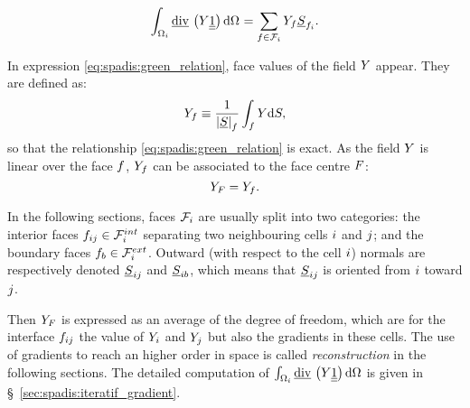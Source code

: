 \begin{equation}\label{eq:spadis:green_relation}
\int_{\Omega_{i}} \underline{\text{div}}\, \left( Y \underline{\underline{1}}\right) \mathrm{d} \Omega_{} =  \sum\limits_{{f} \in \mathcal{F}_{i}} Y_{{f}}\underline{S}_{{f_i}}.
\end{equation}

In expression \eqref{eq:spadis:green_relation}, face values of the field $Y$ appear. They are defined as:
\begin{equation}\label{eq:spadis:variaf_def}
Y_{f} \equiv \dfrac{1}{\left| \underline{S} \right|_{f}} \int_{{f}} Y \mathrm{d} S,
\end{equation}
%
so that the relationship \eqref{eq:spadis:green_relation} is exact. As the field $Y$ is linear over the face ${f}$,
$Y_{f}$ can be associated to the face centre $F$:
\begin{equation}\label{eq:spadis:variaf_id}
Y_F = Y_{f}.
\end{equation}

In the following sections, faces $\mathcal{F}_{i}$ are usually split into two categories: the interior faces ${f_{ij}} \in \mathcal{F}^{int}_{i}$ separating
two neighbouring cells $i$ and $j$; and the boundary faces ${f_{b}} \in \mathcal{F}^{ext}_{i}$.
Outward (with respect to the cell $i$) normals are respectively denoted  $\underline{S}_{ij}$ and $\underline{S}_{ib}$,
which means that $\underline{S}_{ij}$ is oriented from $i$ toward $j$.

Then $Y_{F}$ is expressed as an average of the degree of freedom, which are for the interface ${f_{ij}}$ the value of $Y_i$
and $Y_j$ but also the gradients in these cells. The use of gradients to reach an higher order in space is called \emph{reconstruction}
in the following sections. The detailed computation of $\int_{\Omega_{i}} \underline{\text{div}}\, \left( Y \underline{\underline{1}}\right) \mathrm{d} \Omega $ is given in
 \S~\ref{sec:spadis:iteratif_gradient}.
%

